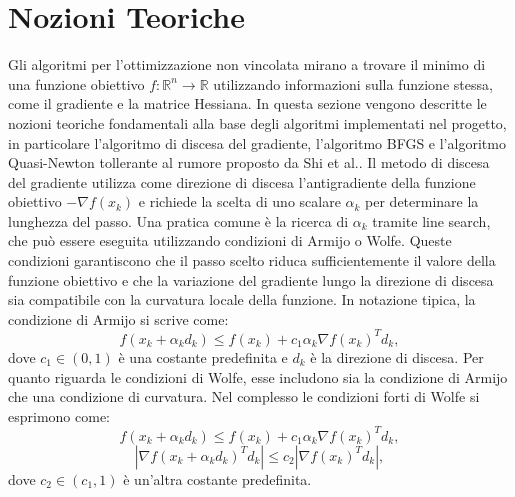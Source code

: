 \section{Nozioni Teoriche}\label{sec:nozioni_teoriche}
Gli algoritmi per l'ottimizzazione non vincolata mirano a trovare il minimo di una funzione obiettivo \( f: \mathbb{R}^n \rightarrow \mathbb{R} \) utilizzando informazioni sulla funzione stessa, come il gradiente e la matrice Hessiana. In questa sezione vengono descritte le nozioni teoriche fondamentali alla base degli algoritmi implementati nel progetto, in particolare l'algoritmo di discesa del gradiente, l'algoritmo BFGS e l'algoritmo Quasi-Newton tollerante al rumore proposto da Shi et al.\cite{shi2022noise}. Il metodo di discesa del gradiente utilizza come direzione di discesa l'antigradiente della funzione obiettivo \(- \nabla f(x_k)\) e richiede la scelta di uno scalare \( \alpha_k \) per determinare la lunghezza del passo. Una pratica comune è la ricerca di \( \alpha_k \) tramite line search, che può essere eseguita utilizzando condizioni di Armijo o Wolfe. Queste condizioni garantiscono che il passo scelto riduca sufficientemente il valore della funzione obiettivo e che la variazione del gradiente lungo la direzione di discesa sia compatibile con la curvatura locale della funzione. In notazione tipica, la condizione di Armijo si scrive come:
\begin{equation}
f(x_k + \alpha_k d_k) \leq f(x_k) + c_1 \alpha_k \nabla {f(x_k)}^T d_k,
\end{equation}
dove \( c_1 \in (0,1) \) è una costante predefinita e \( d_k \) è la direzione di discesa.
Per quanto riguarda le condizioni di Wolfe, esse includono sia la condizione di Armijo che una condizione di curvatura. Nel complesso le condizioni forti di Wolfe si esprimono come:
\begin{equation}\label{eq:armijo}
    f(x_k + \alpha_k d_k) \leq f(x_k) + c_1 \alpha_k \nabla {f(x_k)}^T d_k,
\end{equation}
\begin{equation}\label{eq:strong_wolfe}
    |\nabla {f(x_k + \alpha_k d_k)}^T d_k| \leq c_2 |\nabla {f(x_k)}^T d_k|,
\end{equation}
dove \( c_2 \in (c_1,1) \) è un'altra costante predefinita.

